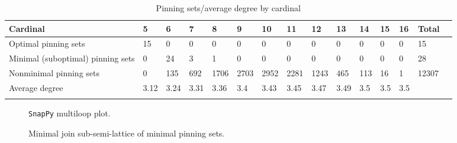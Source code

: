 \documentclass{article}%
\begin{document}
\begin{table}[ht]
	\caption{Pinning sets/average degree by cardinal}
	\centering
	\renewcommand{\arraystretch}{1.5}
	\begin{tabularx}{\textwidth}{lXXXXXXXXXXXXXX}
		\toprule
			Cardinal & 5 & 6 & 7 & 8 & 9 & 10 & 11 & 12 & 13 & 14 & 15 & 16 & Total\\
			\hline
			Optimal pinning sets & 15 & 0 & 0 & 0 & 0 & 0 & 0 & 0 & 0 & 0 & 0 & 0 & 15 \\
			Minimal (suboptimal) pinning sets & 0 & 24 & 3 & 1 & 0 & 0 & 0 & 0 & 0 & 0 & 0 & 0 & 28 \\
			Nonminimal pinning sets & 0 & 135 & 692 & 1706 & 2703 & 2952 & 2281 & 1243 & 465 & 113 & 16 & 1 & 12307 \\
			Average degree & 3.12 & 3.24 & 3.31 & 3.36 & 3.4 & 3.43 & 3.45 & 3.47 & 3.49 & 3.5 & 3.5 & 3.5 &  \\
		\bottomrule \\ 
	\end{tabularx}
\end{table}

\begin{multicols}{2}
\begin{figure}[H]
\centering

\caption{\texttt{SnapPy} multiloop plot.}
\label{fig:tex/img/[[6, 28, 1, 7], [7, 22, 8, 23], [11, 5, 12, 6], [20, 27, 21, 28], [1, 21, 2, 22], [8, 15, 9, 16], [23, 16, 24, 17], [17, 10, 18, 11], [18, 4, 19, 5], [12, 19, 13, 20], [26, 2, 27, 3], [14, 25, 15, 26].svg}
\end{figure}
\columnbreak

\begin{figure}[H]
\centering
\scalebox{0.8}{}
\caption{Minimal join sub-semi-lattice of minimal pinning sets.}
\label{fig:tex/img/[[6, 28, 1, 7], [7, 22, 8, 23], [11, 5, 12, 6], [20, 27, 21, 28], [1, 21, 2, 22], [8, 15, 9, 16], [23, 16, 24, 17], [17, 10, 18, 11], [18, 4, 19, 5], [12, 19, 13, 20], [26, 2, 27, 3], [14, 25, 15, 26].pgf}
\end{figure}
\end{multicols}
\end{document}
